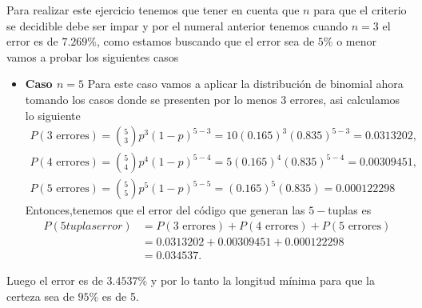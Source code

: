\begin{sol}
  Para realizar este ejercicio tenemos que tener en cuenta que $n$ para que el criterio se decidible debe ser impar y por el numeral anterior tenemos cuando $n=3$ el error es de $7.269\%$, como estamos buscando que el error sea de $5\%$ o menor vamos a probar los siguientes casos
  \begin{itemize}
    \item \textbf{ Caso $n=5$}
    Para este caso vamos a aplicar la distribución de binomial ahora tomando los casos donde se presenten por lo menos 3 errores, asi calculamos lo siguiente
    \begin{align*}
    P(\text{3 errores}) &= \binom{5}{3} p^3 (1-p)^{5-3}=10 (0.165)^3 (0.835)^{5-3}=0.0313202, \\
    P(\text{4 errores}) &= \binom{5}{4} p^4 (1-p)^{5-4}=5(0.165)^4 (0.835)^{5-4}=0.00309451, \\
    P(\text{5 errores}) &= \binom{5}{5} p^5 (1-p)^{5-5}=(0.165)^5 (0.835)=0.000122298
\end{align*}
Entonces,tenemos que el error del código que generan las $5-$tuplas es 
\begin{align*}   
   P(5tuplaserror)&=P(\text{3 errores})+ P(\text{4 errores})+ P(\text{5 errores})\\
&= 0.0313202+0.00309451+0.000122298\\
&=0.034537
.\end{align*}


  \end{itemize}

Luego el error es de $3.4537\%$ y por lo tanto la longitud mínima para que la certeza sea de $95\%$ es de 5.



\end{sol}
